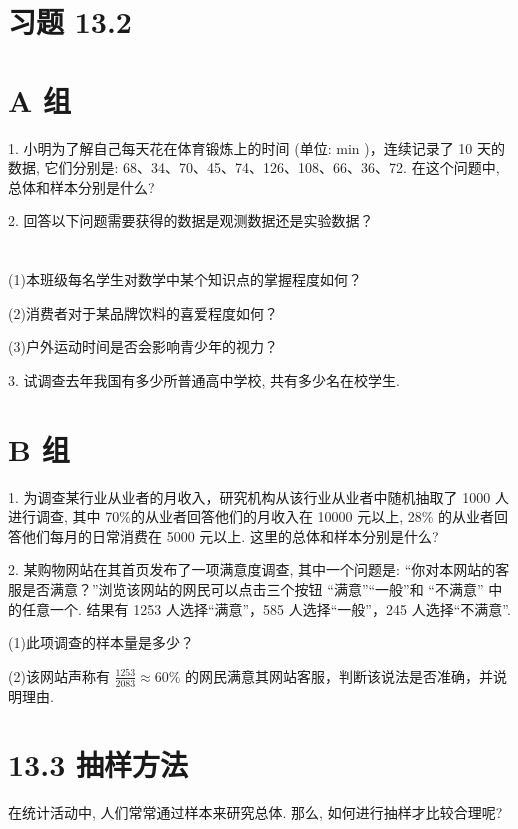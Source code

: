 \documentclass[10pt]{article}
\begin{document}
\section*{习题 13.2}

\section*{A 组}

1. 小明为了解自己每天花在体育锻炼上的时间 (单位: \(\mathrm{{min}}\) )，连续记录了 10 天的数据, 它们分别是: 68、34、70、45、74、126、108、66、36、72. 在这个问题中, 总体和样本分别是什么?

2. 回答以下问题需要获得的数据是观测数据还是实验数据？



\section*{}

(1)本班级每名学生对数学中某个知识点的掌握程度如何？

(2)消费者对于某品牌饮料的喜爱程度如何？

(3)户外运动时间是否会影响青少年的视力？

3. 试调查去年我国有多少所普通高中学校, 共有多少名在校学生.

\section*{B 组}

1. 为调查某行业从业者的月收入，研究机构从该行业从业者中随机抽取了 1000 人进行调查, 其中 70\%的从业者回答他们的月收入在 10000 元以上, 28\% 的从业者回答他们每月的日常消费在 5000 元以上. 这里的总体和样本分别是什么?

2. 某购物网站在其首页发布了一项满意度调查, 其中一个问题是: “你对本网站的客服是否满意？”浏览该网站的网民可以点击三个按钮 “满意”“一般”和 “不满意” 中的任意一个. 结果有 1253 人选择“满意”，585 人选择“一般”，245 人选择“不满意”.

(1)此项调查的样本量是多少？

(2)该网站声称有 \(\frac{1253}{2083} \approx  {60}\%\) 的网民满意其网站客服，判断该说法是否准确，并说明理由.



\section*{13.3 抽样方法}

在统计活动中, 人们常常通过样本来研究总体. 那么, 如何进行抽样才比较合理呢?
\end{document}
